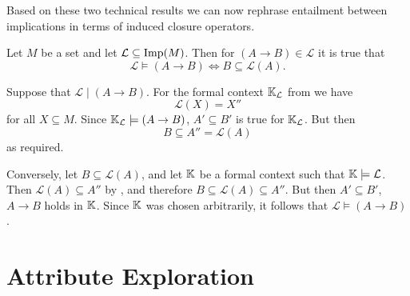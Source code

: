 Based on these two technical results we can now rephrase entailment between implications
in terms of induced closure operators.

\begin{Lemma}
  \label{lem:characterization-of-entailment-in-terms-of-induced-closure-operators}
  Let $M$ be a set and let $\mathcal{L} \subseteq \operatorname{Imp}(M)$.  Then for $(A \to B) \in
  \mathcal{L}$ it is true that
  \begin{equation}
    \label{eq:7}
    \mathcal{L} \models (A \to B) \iff B \subseteq \mathcal{L}(A).
  \end{equation}
\end{Lemma}
\begin{Proof}
  Suppose that $\mathcal{L} \mid (A \to B)$.  For the formal context ${\mathbb{K}}_{\mathcal{L}}$ from  we have
  \begin{equation*}
    \mathcal{L}(X) = X''
  \end{equation*}
  for all $X \subseteq M$.  Since ${\mathbb{K}}_{\mathcal{L}} \models (A \to B)$, $A' \subseteq
  B'$ is true for ${\mathbb{K}}_{\mathcal{L}}$.  But then
  \begin{equation*}
    B \subseteq A'' = \mathcal{L}(A)
  \end{equation*}
  as required.

  Conversely, let $B \subseteq \mathcal{L}(A)$, and let ${\mathbb{K}}$ be a formal context such
  that ${\mathbb{K}} \models \mathcal{L}$.  Then $\mathcal{L}(A) \subseteq A''$ by
  , and therefore $B
  \subseteq \mathcal{L}(A) \subseteq A''$.  But then $A' \subseteq B'$, \ie $A \to B$
  holds in ${\mathbb{K}}$.  Since ${\mathbb{K}}$ was chosen arbitrarily, it follows that $\mathcal{L}
  \models (A \to B)$.  
\end{Proof}

%
%

\section{Attribute Exploration}
\label{sec:attr-expl}

%
%



